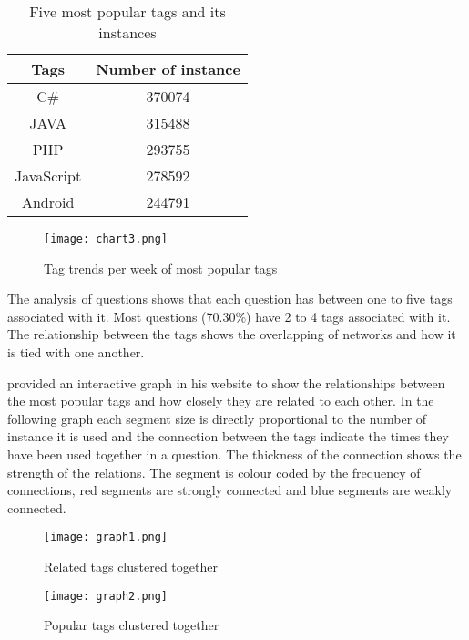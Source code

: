\begin{table}[!htb]
  \centering
  \begin{tabular}{cc}
  \toprule
  \textbf{Tags} & \textbf{Number of instance}\\  \midrule
   C\# & 370074 \\ \midrule
   JAVA &  315488 \\ \midrule
   PHP & 293755 \\ \midrule
   JavaScript & 278592 \\ \midrule
   Android & 244791 \\
  \bottomrule
  \end{tabular}
  \caption{Five most popular tags and its instances}
  \label{Table:tabex2}
\end{table}

\begin{figure}[!htb]
  \centering
  \texttt{[image: chart3.png]}
  \caption{Tag trends per week of most popular tags}
  \label{Figure:figex4d}
\end{figure}

The analysis of questions shows that each question has between one to five tags associated with it. Most questions (70.30\%) have 2 to 4 tags associated with it. The relationship between the tags shows the overlapping of networks and how it is tied with one another.

\cite{Eberhardt2012} provided an interactive graph in his website to show the relationships between the most popular tags and how closely they are related to each other. In the following graph each segment size is directly proportional to the number of instance it is used and the connection between the tags indicate the times they have been used together in a question. The thickness of the connection shows the strength of the relations. The segment is colour coded by the frequency of connections, red segments are strongly connected and blue segments are weakly connected.

\begin{figure}[!htb]
  \centering
  \texttt{[image: graph1.png]}
  \caption{Related tags clustered together}
  \label{Figure:figex4e}
\end{figure}

\begin{figure}[!htb]
  \centering
  \texttt{[image: graph2.png]}
  \caption{Popular tags clustered together}
  \label{Figure:figex4f}
\end{figure}

